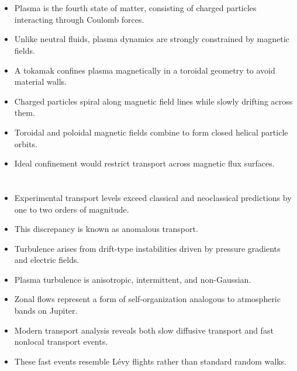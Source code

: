 \documentclass{article}
\begin{document}
\section{}
\begin{itemize}
\item Plasma is the fourth state of matter, consisting of charged particles interacting through Coulomb forces.
\item Unlike neutral fluids, plasma dynamics are strongly constrained by magnetic fields.
\item A tokamak confines plasma magnetically in a toroidal geometry to avoid material walls.
\item Charged particles spiral along magnetic field lines while slowly drifting across them.
\item Toroidal and poloidal magnetic fields combine to form closed helical particle orbits.
\item Ideal confinement would restrict transport across magnetic flux surfaces.
\end{itemize}

\section{}
\begin{itemize}
\item Experimental transport levels exceed classical and neoclassical predictions by one to two orders of magnitude.
\item This discrepancy is known as anomalous transport.
\item Turbulence arises from drift-type instabilities driven by pressure gradients and electric fields.
\item Plasma turbulence is anisotropic, intermittent, and non-Gaussian.
\item Zonal flows represent a form of self-organization analogous to atmospheric bands on Jupiter.
\item Modern transport analysis reveals both slow diffusive transport and fast nonlocal transport events.
\item These fast events resemble Lévy flights rather than standard random walks.
\end{itemize}

\section{}
\end{document}
